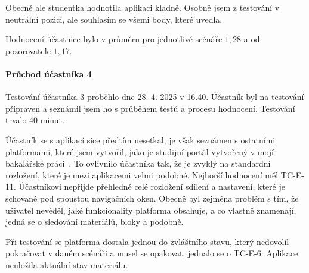 Obecně ale studentka hodnotila aplikaci kladně.
Osobně jsem z testování v neutrální pozici, ale souhlasím se všemi body, které uvedla.

Hodnocení účastnice bylo v průměru pro jednotlivé scénáře $1,28$ a od pozorovatele $1,17$.


\paragraph{Průchod účastníka 4}

Testování účastníka 3 proběhlo dne 28. 4. 2025 v 16.40. 
Účastník byl na testování připraven a seznámil jsem ho s průběhem testů a procesu hodnocení. 
Testování trvalo 40 minut.

Účastník se s aplikací sice předtím nesetkal, je však seznámen s ostatními platformami, které jsem vytvořil, jako je studijní portál vytvořený v mojí bakalářské práci~\cite{cajthaml_bp}.
To ovlivnilo účastníka tak, že je zvyklý na standardní rozložení, které je mezi aplikacemi velmi podobné.
Nejhorší hodnocení měl TC-E-11. 
Účastníkovi nepřijde přehledné celé rozložení sdílení a nastavení, které je schované pod spoustou navigačních oken.
Obecně byl zejména problém s tím, že uživatel nevěděl, jaké funkcionality platforma obsahuje, a co vlastně znamenají, jedná se o sledování materiálů, bloky a podobně.

Při testování se platforma dostala jednou do zvláštního stavu, který nedovolil pokračovat v daném scénáři a musel se opakovat, jednalo se o TC-E-6.
Aplikace neuložila aktuální stav materiálu.

